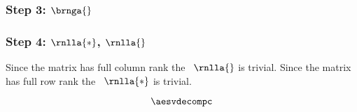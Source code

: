 \subsubsection{Step 3: $\brnga{}$}



\subsubsection{Step 4: $\rnlla{*}$, $\rnlla{}$}
Since the matrix has full column rank the \ns \ $\rnlla{}$ is trivial. Since the matrix has full row rank the \ns \ $\rnlla{*}$ is trivial.

\begin{equation}
  \aesvdecompc
\end{equation}


\endinput